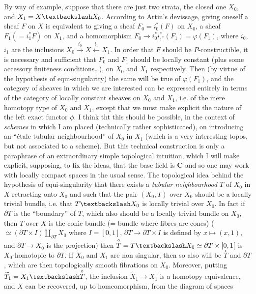 By way of example, suppose that there are just two strata, the closed one $X_0$, and $X_1 = X \textbackslash X_0$. According to Artin's devissage, giving oneself a sheaf $F$ on $X$ is equivalent to giving a sheaf $F_0 = i^*_0(F)$ on $X_0$, a sheaf $F_1(= i_1^* F)$ on $X_1$, and a homomorphism $F_0 \to i^*_0 i^*_{1^*}(F_1) = \varphi(F_1)$, where $i_0$, $i_1$ are the inclusions $X_0 \xrightarrow{i_0} X \xleftarrow{i_1} X_1$. In order that $F$ should be $P$-constructible, it is necessary and sufficient that $F_0$ and $F_1$ should be locally constant (plus some accessory finiteness conditions\dots), on $X_0$ and $X_1$ respectively. Then (by virtue of the hypothesis of equi-singularity) the same will be true of $\varphi(F_1)$, and the category of sheaves in which we are interested can be expressed entirely in terms of the category of locally constant sheaves on $X_0$ and $X_1$, i.e. of the mere homotopy type of $X_0$ and $X_1$, except that we must make explicit the nature of the left exact functor $\phi$. I think tht this should be possible, in the context of \emph{schemes} in which I am placed (technically rather sophisticated), on introducing an ``étale tubular neighbourhood'' of $X_0$ in $X_1$ (which is a very interesting topos, but not associated to a scheme). But this technical construction is only a paraphrase of an extraordinary simple topological intuition, which I will make explicit, supposing, to fix the ideas, that the base field is $\mathbf{C}$ and so one may work with locally compact spaces in the usual sense. The topological idea behind the hypothesis of equi-singularity  that there exists a \emph{tubular neighbourhood} $T$ of $X_0$ in $X$ retracting onto $X_0$ and such that the pair $(X_0, T)$ over $X_0$ should be a locally trivial bundle, i.e. that $T \textbackslash X_0$ is locally trivial over $X_0$. In fact if $\partial T$ is the ``boundary'' of $T$, which also should be a locally trivial bundle on $X_0$, then $T$ over $X$ is the conic bundle (= bundle where fibres are cones) ($\simeq (\partial T \times I) \amalg_{\partial T} X_0$ where $I = [0, 1]$, $\partial T \to \partial T \times I$ is defined by $x \mapsto (x, 1)$, and $\partial T \to X_0$ is the projection) then $\overset{\circ}{T} = T \textbackslash X_0 \simeq \partial T \times [0, 1 [$ is $X_0$-homotopic to $\partial T$. If $X_0$ and $X_1$ are non singular, then so also will be $\overset{\circ}{T}$ and $\partial T$, which are then topologically smooth fibrations on $X_0$. Moreover, putting $\widetilde{T}_1 = X_1 \textbackslash \overset{\circ}{T}$, the inclusion $\widetilde{X}_1 \to X_1$ is a homotopy equivalence, and $X$ can be recovered, up to homeomorphism, from the diagram of spaces
